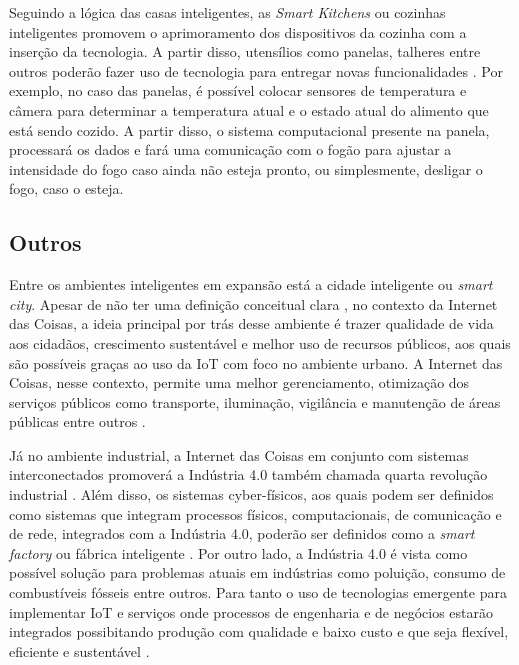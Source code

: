
Seguindo a lógica das casas inteligentes, as \textit{Smart Kitchens} ou cozinhas inteligentes promovem o aprimoramento dos dispositivos da cozinha com a inserção da tecnologia. A partir disso, utensílios como panelas, talheres entre outros poderão fazer uso de tecnologia para entregar novas funcionalidades \cite{Staender2012}. Por exemplo, no caso das panelas, é possível colocar sensores de temperatura e câmera para determinar a temperatura atual e o estado atual do alimento que está sendo cozido. A partir disso, o sistema computacional presente na panela, processará os dados e fará uma comunicação com o fogão para ajustar a intensidade do fogo caso ainda não esteja pronto, ou simplesmente, desligar o fogo, caso o esteja. 

\subsection{Outros}



Entre os ambientes inteligentes em expansão está a cidade inteligente ou \textit{smart city}. Apesar de não ter uma definição conceitual clara \cite{Cocchia2014}, no contexto da Internet das Coisas, a ideia principal por trás desse ambiente é trazer qualidade de vida aos cidadãos, crescimento sustentável e melhor uso de recursos públicos, aos quais são possíveis graças ao uso da IoT com foco no ambiente urbano. A Internet das Coisas, nesse contexto, permite uma melhor gerenciamento, otimização dos serviços públicos como transporte, iluminação, vigilância e manutenção de áreas públicas entre outros  \cite{Zanella2014}. 

%
Já no ambiente industrial, a Internet das Coisas em conjunto com sistemas interconectados promoverá a Indústria 4.0 também chamada quarta revolução industrial . Além disso, os sistemas cyber-físicos, aos quais podem ser definidos como sistemas que integram processos físicos, computacionais, de comunicação e de rede, integrados com a Indústria 4.0, poderão ser definidos como a \textit{smart factory} ou fábrica inteligente \cite{Lee2015}. Por outro lado, a Indústria 4.0 é vista como possível solução para problemas atuais em indústrias como poluição, consumo de combustíveis fósseis entre outros. Para tanto o uso de tecnologias emergente para implementar IoT e serviços onde processos de engenharia e de negócios estarão integrados possibitando produção com qualidade e baixo custo e que seja flexível, eficiente e sustentável \cite{Hussain2016}.


